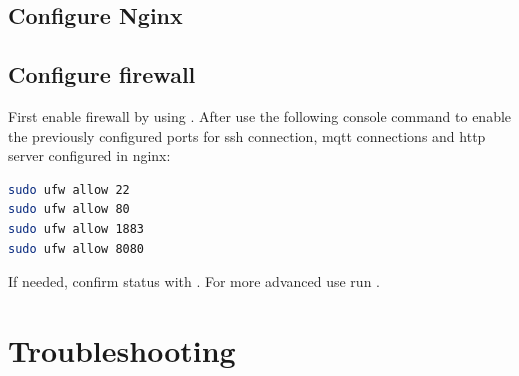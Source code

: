 \subsection{Configure Nginx}
\blindtext

\subsection{Configure firewall}
First enable firewall by using . After use the following console command to enable the previously configured ports for ssh connection, mqtt connections and http server configured in nginx:
\begin{lstlisting}[frame=none,language=bash,backgroundcolor=\color{gray!15},numbers=none,		basicstyle=\ttfamily]
sudo ufw allow 22
sudo ufw allow 80
sudo ufw allow 1883
sudo ufw allow 8080
\end{lstlisting}
If needed, confirm status with . For more advanced use run .

\section{Troubleshooting}

